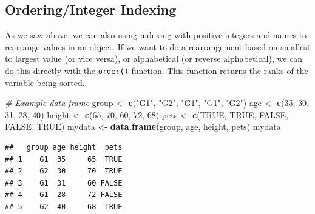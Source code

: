\documentclass[
]{book}
\newenvironment{Shaded}{\begin{snugshade}}{\end{snugshade}}
\newcommand{\CommentTok}[1]{\textcolor[rgb]{0.56,0.35,0.01}{\textit{#1}}}
\newcommand{\DecValTok}[1]{\textcolor[rgb]{0.00,0.00,0.81}{#1}}
\newcommand{\KeywordTok}[1]{\textcolor[rgb]{0.13,0.29,0.53}{\textbf{#1}}}
\newcommand{\NormalTok}[1]{#1}
\newcommand{\OperatorTok}[1]{\textcolor[rgb]{0.81,0.36,0.00}{\textbf{#1}}}
\newcommand{\OtherTok}[1]{\textcolor[rgb]{0.56,0.35,0.01}{#1}}
\newcommand{\StringTok}[1]{\textcolor[rgb]{0.31,0.60,0.02}{#1}}
\begin{document}
\hypertarget{orderinginteger-indexing}{%
\subsection{Ordering/Integer Indexing}\label{orderinginteger-indexing}}

As we saw above, we can also using indexing with positive integers and names to rearrange values in an object. If we want to do a rearrangement based on smallest to largest value (or vice versa), or alphabetical (or reverse alphabetical), we can do this directly with the \texttt{order()} function. This function returns the ranks of the variable being sorted.

\begin{Shaded}
\begin{Highlighting}[]
\CommentTok{# Example data frame}
\NormalTok{group <-}\StringTok{ }\KeywordTok{c}\NormalTok{(}\StringTok{"G1"}\NormalTok{, }\StringTok{"G2"}\NormalTok{, }\StringTok{"G1"}\NormalTok{, }\StringTok{"G1"}\NormalTok{, }\StringTok{"G2"}\NormalTok{)}
\NormalTok{age <-}\StringTok{ }\KeywordTok{c}\NormalTok{(}\DecValTok{35}\NormalTok{, }\DecValTok{30}\NormalTok{, }\DecValTok{31}\NormalTok{, }\DecValTok{28}\NormalTok{, }\DecValTok{40}\NormalTok{)}
\NormalTok{height <-}\StringTok{ }\KeywordTok{c}\NormalTok{(}\DecValTok{65}\NormalTok{, }\DecValTok{70}\NormalTok{, }\DecValTok{60}\NormalTok{, }\DecValTok{72}\NormalTok{, }\DecValTok{68}\NormalTok{)}
\NormalTok{pets <-}\StringTok{ }\KeywordTok{c}\NormalTok{(}\OtherTok{TRUE}\NormalTok{, }\OtherTok{TRUE}\NormalTok{, }\OtherTok{FALSE}\NormalTok{, }\OtherTok{FALSE}\NormalTok{, }\OtherTok{TRUE}\NormalTok{)}
\NormalTok{mydata <-}\StringTok{ }\KeywordTok{data.frame}\NormalTok{(group, age, height, pets)}
\NormalTok{mydata}
\end{Highlighting}
\end{Shaded}

\begin{verbatim}
##   group age height  pets
## 1    G1  35     65  TRUE
## 2    G2  30     70  TRUE
## 3    G1  31     60 FALSE
## 4    G1  28     72 FALSE
## 5    G2  40     68  TRUE
\end{verbatim}

\begin{Shaded}
\end{Shaded}
\end{document}
